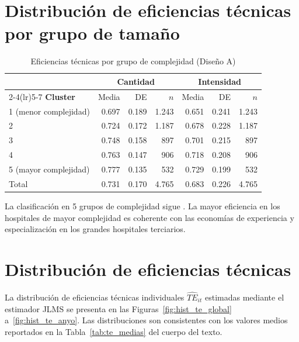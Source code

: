 \section{Distribución de eficiencias técnicas por grupo de tamaño}

\begin{table}[htbp]
\centering
\caption{Eficiencias técnicas por grupo de complejidad (Diseño A)}
\label{tab:te_cluster}
\begin{threeparttable}
\small
\begin{tabular}{lrrrrrr}
\toprule
& \multicolumn{3}{c}{\textbf{Cantidad}} & \multicolumn{3}{c}{\textbf{Intensidad}} \\
\cmidrule(lr){2-4}\cmidrule(lr){5-7}
\textbf{Cluster} & Media & DE & $n$ & Media & DE & $n$ \\
\midrule
1 (menor complejidad) & 0.697 & 0.189 & 1.243 & 0.651 & 0.241 & 1.243 \\
2                     & 0.724 & 0.172 & 1.187 & 0.678 & 0.228 & 1.187 \\
3                     & 0.748 & 0.158 & 897   & 0.701 & 0.215 & 897   \\
4                     & 0.763 & 0.147 & 906   & 0.718 & 0.208 & 906   \\
5 (mayor complejidad) & 0.777 & 0.135 & 532   & 0.729 & 0.199 & 532   \\
\midrule
Total                 & 0.731 & 0.170 & 4.765 & 0.683 & 0.226 & 4.765 \\
\bottomrule
\end{tabular}
\begin{tablenotes}
  \small
  \item La clasificación en 5 grupos de complejidad sigue \citet{ministerio2007}. La mayor eficiencia en los hospitales de mayor complejidad es coherente con las economías de experiencia y especialización en los grandes hospitales terciarios.
\end{tablenotes}
\end{threeparttable}
\end{table}

\section{Distribución de eficiencias técnicas}
\label{sec:hist_eficiencias}

La distribución de eficiencias técnicas individuales $\widehat{TE}_{it}$ estimadas
mediante el estimador JLMS \citep{jondrow1982} se presenta en las
Figuras~\ref{fig:hist_te_global} a~\ref{fig:hist_te_anyo}.
Las distribuciones son consistentes con los valores medios reportados en la
Tabla~\ref{tab:te_medias} del cuerpo del texto.

